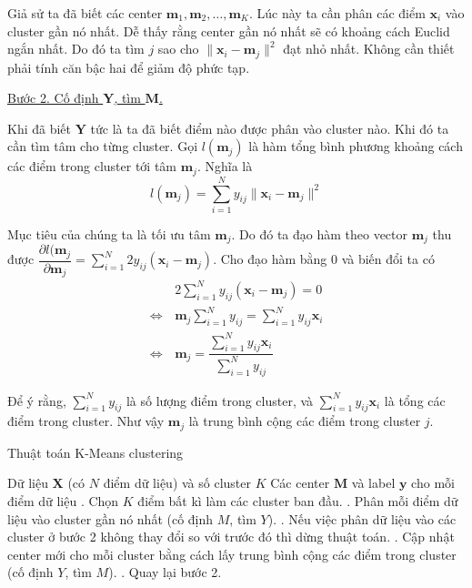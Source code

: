 \documentclass{mynotes}
\begin{document}
Giả sử ta đã biết các center $\bm{m}_1, \bm{m}_2, \ldots, \bm{m}_K$. Lúc này ta cần phân các điểm $\bm{x}_i$ vào cluster gần nó nhất. Dễ thấy rằng center gần nó nhất sẽ có khoảng cách Euclid ngắn nhất. Do đó ta tìm $j$ sao cho $\lVert \bm{x}_i - \bm{m}_j \rVert^2$ đạt nhỏ nhất. Không cần thiết phải tính căn bậc hai để giảm độ phức tạp.

\underline{Bước 2. Cố định $\bm{Y}$, tìm $\bm{M}$.}

Khi đã biết $\bm{Y}$ tức là ta đã biết điểm nào được phân vào cluster nào. Khi đó ta cần tìm tâm cho từng cluster. Gọi $l (\bm{m}_j)$ là hàm tổng bình phương khoảng cách các điểm trong cluster tới tâm $\bm{m}_j$. Nghĩa là \[ l (\bm{m}_j) = \sum_{i=1}^N y_{ij} \lVert \bm{x}_i - \bm{m}_j \rVert^2 \]

Mục tiêu của chúng ta là tối ưu tâm $\bm{m}_j$. Do đó ta đạo hàm theo vector $\bm{m}_j$ thu được $\dfrac{\partial l(\bm{m}_j}{\partial \bm{m}_j} = \sum_{i=1}^N 2 y_{ij} (\bm{x}_i - \bm{m}_j)$. Cho đạo hàm bằng 0 và biến đổi ta có \begin{align*}
    & 2 \sum_{i=1}^N y_{ij} (\bm{x}_i - \bm{m}_j) = 0 \\ \Leftrightarrow \, & \bm{m}_j \sum_{i=1}^N y_{ij} = \sum_{i=1}^N y_{ij} \bm{x}_i \\ \Leftrightarrow \, & \bm{m}_j = \dfrac{\sum_{i=1}^N y_{ij} \bm{x}_i}{\sum_{i=1}^N y_{ij}}
\end{align*}

Để ý rằng, $\sum_{i=1}^N y_{ij}$ là số lượng điểm trong cluster, và $\sum_{i=1}^N y_{ij} \bm{x}_i$ là tổng các điểm trong cluster. Như vậy $\bm{m}_j$ là trung bình cộng các điểm trong cluster $j$.

\begin{algorithm}
    \caption{Thuật toán K-Means clustering}
    \begin{algorithmic}
        \Require Dữ liệu $\bm{X}$ (có $N$ điểm dữ liệu) và số cluster $K$
        \Ensure Các center $\bm{M}$ và label $\bm{y}$ cho mỗi điểm dữ liệu
        . Chọn $K$ điểm bất kì làm các cluster ban đầu.
        . Phân mỗi điểm dữ liệu vào cluster gần nó nhất (cố định $M$, tìm $Y$).
        . Nếu việc phân dữ liệu vào các cluster ở bước 2 không thay đổi so với trước đó thì dừng thuật toán.
        . Cập nhật center mới cho mỗi cluster bằng cách lấy trung bình cộng các điểm trong cluster (cố định $Y$, tìm $M$).
        . Quay lại bước 2.
    \end{algorithmic}
\end{algorithm}
\end{document}

